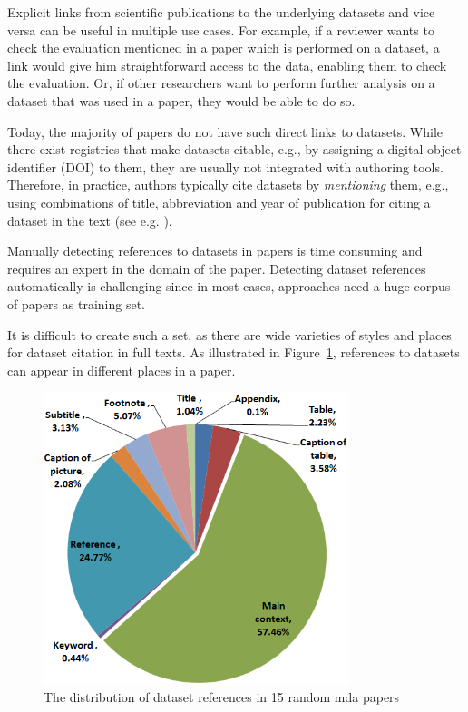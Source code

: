 \documentclass{IOS-Book-Article}
\begin{document}
Explicit links from scientific publications to the underlying datasets and vice versa can be useful in multiple use cases.
For example, if a reviewer wants to check the evaluation mentioned in a paper which is performed on a dataset, a link would give him straightforward access to the data, enabling them to check the evaluation.
Or, if other researchers want to perform further analysis on a dataset that was used in a paper, they would be able to do so. 

Today, the majority of papers do not have such direct links to datasets.
While there exist registries that make datasets citable, e.g., by assigning a digital object identifier (DOI) to them, they are usually not integrated with authoring tools.
Therefore, in practice, authors typically cite datasets by \emph{mentioning} them, e.g., using  
combinations of title, abbreviation and year of publication for citing a dataset in the text (see e.g. \citet{Mathiak2015}).  

Manually detecting references to datasets in papers is time consuming and requires an expert in the domain of the paper. 
Detecting dataset references automatically is challenging since in most cases, approaches need a huge corpus of papers as training set. 

It is difficult to create such a set, as there are wide varieties of styles and places for dataset citation in full texts. 
As illustrated in Figure~\ref{fig:places-example}, references to datasets can appear in different places in a paper.  

\begin{figure}[h]
	\centering
	\includegraphics[width=3.5in]{DistPlaces3.PNG}
	\caption{The distribution of dataset references in 15 random mda papers}
	\label{fig:places-example}
\end{figure}
\end{document}
